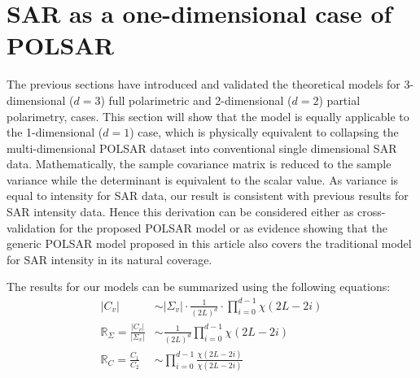 \documentclass[journal]{IEEEtran}
\begin{document}
\section{SAR as a one-dimensional case of POLSAR}
\label{sec:sar_special_case_of_polsar}

The previous sections have introduced and validated the theoretical models for 3-dimensional ($d=3$) full polarimetric and 2-dimensional ($d=2$) partial polarimetry, cases.
This section will show that the model is equally  applicable to the 1-dimensional ($d=1$) case,
  which is physically equivalent to  collapsing the multi-dimensional POLSAR dataset  into conventional single dimensional SAR data.
Mathematically, the sample covariance matrix is reduced to the sample variance while the determinant is equivalent to  the scalar value.
As variance is equal to intensity for SAR data, our result is consistent with previous results for SAR intensity data.
Hence this derivation can be considered
  either as cross-validation for the proposed POLSAR model
  or as evidence showing that
    the generic POLSAR model proposed in this article also covers the traditional model for SAR intensity in its natural coverage.
  
The results for our models can be summarized using the following equations:
\begin{align*}
  |C_v| &\sim |\Sigma_v| \cdot \frac{1}{(2L)^d} \cdot \prod_{i=0}^{d-1} \chi (2L-2i) \\ %
  \mathbb{R}_{\Sigma} = \frac{|C_v|}{|\Sigma_v|} &\sim \frac{1}{(2L)^d} \prod^{d-1}_{i=0} \chi(2L-2i) \\ %
\mathbb{R}_{C} = \frac{C_1}{C_2} &\sim \prod_{i=0}^{d-1} \frac{\chi(2L-2i)}{\chi(2L-2i)}
\end{align*}
\end{document}
